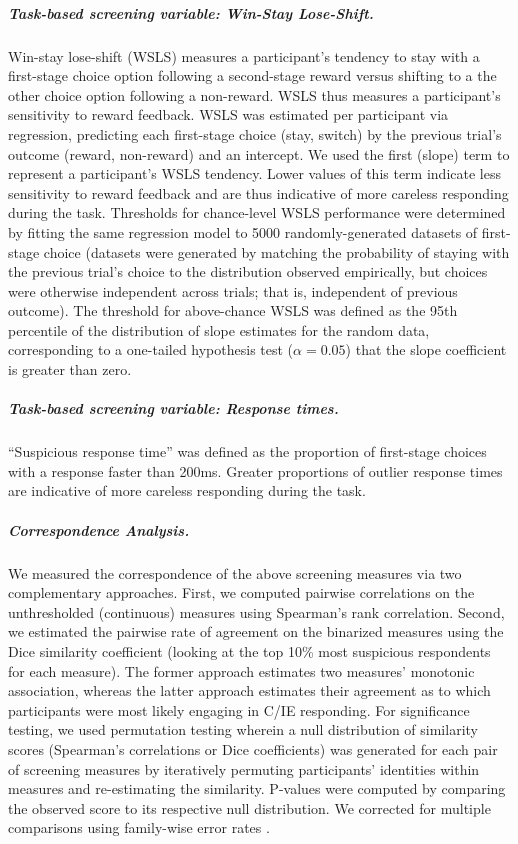 \documentclass[a4paper,notitlepage,12pt]{article}
\begin{document}
\subparagraph{Task-based screening variable: Win-Stay Lose-Shift.} Win-stay lose-shift (WSLS) measures a participant's tendency to stay with a first-stage choice option following a second-stage reward versus shifting to a the other choice option following a non-reward. WSLS thus measures a participant's sensitivity to reward feedback. WSLS was estimated per participant via regression, predicting each first-stage choice (stay, switch) by the previous trial's outcome (reward, non-reward) and an intercept. We used the first (slope) term to represent a participant's WSLS tendency. Lower values of this term indicate less sensitivity to reward feedback and are thus indicative of more careless responding during the task. Thresholds for chance-level WSLS performance were determined by fitting the same regression model to 5000 randomly-generated datasets of first-stage choice (datasets were generated by matching the probability of staying with the previous trial's choice to the distribution observed empirically, but choices were otherwise independent across trials; that is, independent of previous outcome). The threshold for above-chance WSLS was defined as the 95th percentile of the distribution of slope estimates for the random data, corresponding to a one-tailed hypothesis test ($\alpha = 0.05$) that the slope coefficient is greater than zero. 

\subparagraph{Task-based screening variable: Response times.} ``Suspicious response time'' was defined as the proportion of first-stage choices with a response faster than 200ms. Greater proportions of outlier response times are indicative of more careless responding during the task.

\subparagraph{Correspondence Analysis.} We measured the correspondence of the above screening measures via two complementary approaches. First, we computed pairwise correlations on the unthresholded (continuous) measures using Spearman's rank correlation. Second, we estimated the pairwise rate of agreement on the binarized measures using the Dice similarity coefficient (looking at the top 10\% most suspicious respondents for each measure). The former approach estimates two measures' monotonic association, whereas the latter approach estimates their agreement as to which participants were most likely engaging in C/IE responding. For significance testing, we used permutation testing wherein a null distribution of similarity scores (Spearman's correlations or Dice coefficients) was generated for each pair of screening measures by iteratively permuting participants' identities within measures and re-estimating the similarity. P-values were computed by comparing the observed score to its respective null distribution. We corrected for multiple comparisons using family-wise error rates \cite{winkler2014permutation-2}.
\end{document}

